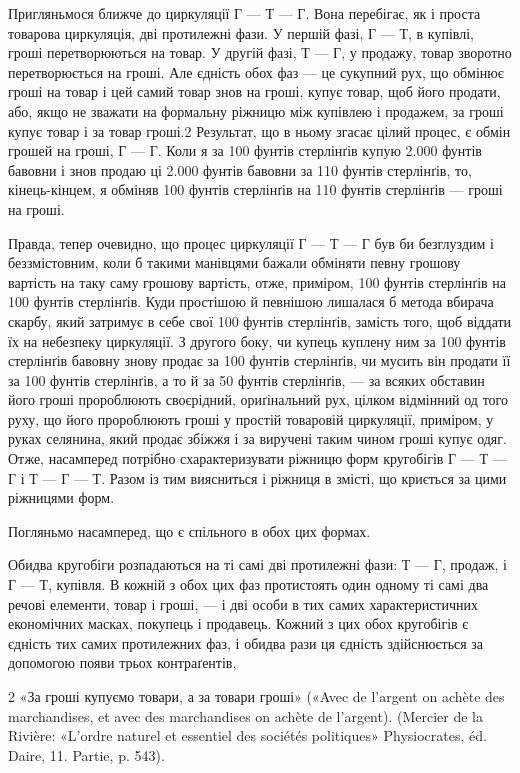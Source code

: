 Пригляньмося ближче до циркуляції Г — Т — Г. Вона перебігає,
як і проста товарова циркуляція, дві протилежні фази.
У першій фазі, Г — Т, в купівлі, гроші перетворюються на товар.
У другій фазі, Т — Г, у продажу, товар зворотно перетворюється
на гроші. Але єдність обох фаз — це сукупний рух, що
обмінює гроші на товар і цей самий товар знов на гроші, купує
товар, щоб його продати, або, якщо не зважати на формальну
ріжницю між купівлею і продажем, за гроші купує товар і за
товар гроші.2 Результат, що в ньому згасає цілий процес, є
обмін грошей на гроші, Г — Г. Коли я за 100 фунтів стерлінґів
купую 2.000 фунтів бавовни і знов продаю ці 2.000 фунтів
бавовни за 110 фунтів стерлінґів, то, кінець-кінцем, я
обміняв 100 фунтів стерлінґів на 110 фунтів стерлінґів — гроші
на гроші.

Правда, тепер очевидно, що процес циркуляції Г — Т — Г
був би безглуздим і беззмістовним, коли б такими манівцями
бажали обміняти певну грошову вартість на таку саму грошову
вартість, отже, приміром, 100 фунтів стерлінґів на 100 фунтів
стерлінґів. Куди простішою й певнішою лишалася б метода
вбирача скарбу, який затримує в себе свої 100 фунтів стерлінґів,
замість того, щоб віддати їх на небезпеку циркуляції. З другого
боку, чи купець куплену ним за 100 фунтів стерлінґів бавовну
знову продає за 100 фунтів стерлінґів, чи мусить він продати її за
100 фунтів стерлінґів, а то й за 50 фунтів стерлінґів, — за всяких
обставин його гроші пророблюють своєрідний, ориґінальний
рух, цілком відмінний од того руху, що його пророблюють
гроші у простій товаровій циркуляції, приміром, у руках селянина,
який продає збіжжя і за виручені таким чином гроші
купує одяг. Отже, насамперед потрібно схарактеризувати ріжницю
форм кругобігів Г — Т — Г і Т — Г — Т. Разом із тим
виясниться і ріжниця в змісті, що криється за цими ріжницями
форм.

Погляньмо насамперед, що є спільного в обох цих формах.

Обидва кругобіги розпадаються на ті самі дві протилежні
фази: Т — Г, продаж, і Г — Т, купівля. В кожній з обох цих
фаз протистоять один одному ті самі два речові елементи, товар
і гроші, — і дві особи в тих самих характеристичних економічних
масках, покупець і продавець. Кожний з цих обох кругобігів
є єдність тих самих протилежних фаз, і обидва рази ця
єдність здійснюється за допомогою появи трьох контраґентів,

2 «За гроші купуємо товари, а за товари гроші» («Avec de l’argent
on achète des marchandises, et avec des marchandises on achète de l’argent).
(Mercier de la Rivière: «L’ordre naturel et essentiel des sociétés
politiques» Physiocrates, éd. Daire, 11. Partie, p. 543).
\parbreak{}  %
